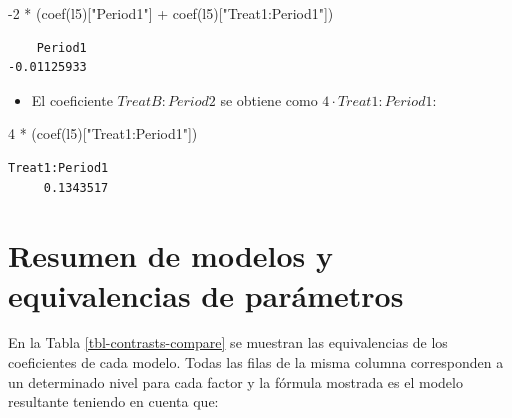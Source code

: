 \documentclass[
  12pt,
  a4paper,
  extrafontsizes,
  onecolumn,
  openright,
  table]{memoir}
\newenvironment{Shaded}{\begin{snugshade}}{\end{snugshade}}
\newcommand{\DecValTok}[1]{\textcolor[rgb]{0.68,0.00,0.00}{#1}}
\newcommand{\FunctionTok}[1]{\textcolor[rgb]{0.28,0.35,0.67}{#1}}
\newcommand{\NormalTok}[1]{\textcolor[rgb]{0.00,0.23,0.31}{#1}}
\newcommand{\SpecialCharTok}[1]{\textcolor[rgb]{0.37,0.37,0.37}{#1}}
\newcommand{\StringTok}[1]{\textcolor[rgb]{0.13,0.47,0.30}{#1}}
\providecommand{\tightlist}{%
  \setlength{\itemsep}{0pt}\setlength{\parskip}{0pt}}\usepackage{longtable,booktabs,array}
\begin{document}
\scriptsize

\begin{Shaded}
\begin{Highlighting}[]
\SpecialCharTok{{-}}\DecValTok{2} \SpecialCharTok{*}\NormalTok{ (}\FunctionTok{coef}\NormalTok{(l5)[}\StringTok{"Period1"}\NormalTok{] }\SpecialCharTok{+} \FunctionTok{coef}\NormalTok{(l5)[}\StringTok{"Treat1:Period1"}\NormalTok{])}
\end{Highlighting}
\end{Shaded}

\begin{verbatim}
    Period1 
-0.01125933 
\end{verbatim}

\normalsize

\begin{itemize}
\tightlist
\item
  El coeficiente \(TreatB:Period2\) se obtiene como
  \(4 \cdot Treat1:Period1\):
\end{itemize}

\scriptsize

\begin{Shaded}
\begin{Highlighting}[]
\DecValTok{4} \SpecialCharTok{*}\NormalTok{ (}\FunctionTok{coef}\NormalTok{(l5)[}\StringTok{"Treat1:Period1"}\NormalTok{])}
\end{Highlighting}
\end{Shaded}

\begin{verbatim}
Treat1:Period1 
     0.1343517 
\end{verbatim}

\normalsize

\hypertarget{resumen-de-modelos-y-equivalencias-de-paruxe1metros}{%
\section{Resumen de modelos y equivalencias de
parámetros}\label{resumen-de-modelos-y-equivalencias-de-paruxe1metros}}

En la Tabla \ref{tbl-contrasts-compare} se muestran las equivalencias de
los coeficientes de cada modelo. Todas las filas de la misma columna
corresponden a un determinado nivel para cada factor y la fórmula
mostrada es el modelo resultante teniendo en cuenta que:
\end{document}
